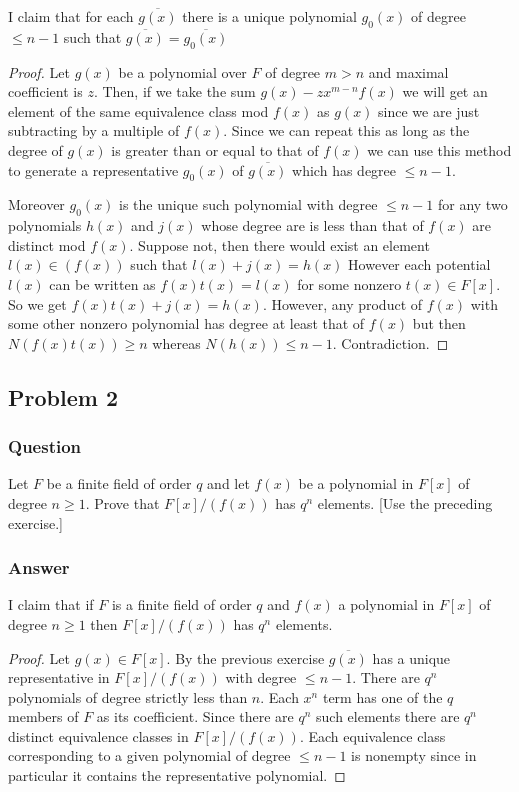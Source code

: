 \documentclass[12pt]{article}
\begin{document}
I claim that for each $\overline{g(x)}$ there is a unique polynomial $g_0(x)$ of degree $\leq n-1$ such that $\overline{g(x)} = \overline{g_0(x)}$
\begin{proof}
Let $g(x)$ be a polynomial over $F$ of degree $m>n$ and maximal coefficient is $z$. Then, if we take the sum $g(x) - z x^{m-n}  f(x)$ we will get an element of the same equivalence class mod $f(x)$ as $g(x)$ since we are just subtracting by a multiple of $f(x)$. Since we can repeat this as long as the degree of $g(x)$ is greater than or equal to that of $f(x)$ we can use this method to generate a representative $g_0(x)$ of $\overline{g(x)}$ which has degree  $\leq n-1$. 

Moreover $g_0(x)$ is the unique such polynomial with degree $\leq n-1$ for any two polynomials $h(x)$ and $j(x)$ whose degree are is less than that of $f(x)$ are distinct mod $f(x)$. Suppose not, then there would exist an element $l(x) \in (f(x))$ such that $l(x)+j(x)=h(x)$ However each potential $l(x)$ can be written as $f(x) t(x)=l(x)$ for some nonzero $t(x) \in F[x]$. So we get $f(x)t(x)+j(x)=h(x)$. However, any product of $f(x)$ with some other nonzero polynomial has degree at least that of $f(x)$ but then $N(f(x)t(x))\geq n$ whereas $N(h(x))\leq n-1$. Contradiction.
\end{proof}

\subsection{Problem 2}

\subsubsection{Question}
Let $F$ be a finite field of order $q$ and let $f(x)$ be a polynomial in $F[x]$ of degree $n \geq 1$. Prove that $F[x]/(f(x))$ has $q^n$ elements. [Use the preceding exercise.]
\subsubsection{Answer}

I claim that if $F$ is a finite field of order $q$ and $f(x)$ a polynomial in $F[x]$ of degree $n \geq 1$ then $F[x]/(f(x))$ has $q^n$ elements.
\begin{proof}
Let $g(x) \in F[x]$. By the previous exercise $\overline{g(x)}$ has a unique representative in $F[x]/(f(x))$ with degree $\leq n-1$. There are $q^n$ polynomials of degree strictly less than $n$. Each $x^n$ term has one of the $q$ members of $F$ as its coefficient. Since there are $q^n$ such elements there are $q^n$ distinct equivalence classes in $F[x]/(f(x))$. Each equivalence class corresponding to a given polynomial of degree $\leq n-1$ is nonempty since in particular it contains the representative polynomial.
\end{proof}
\end{document}
